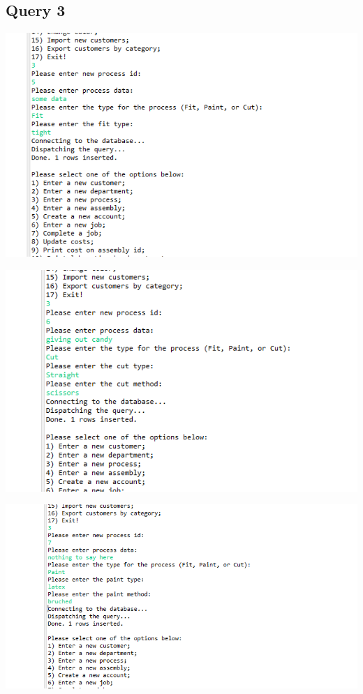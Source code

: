 \documentclass[11pt]{article}
\begin{document}
\subsection{Query 3}
\includegraphics[width = \textwidth]{process1.png}

\includegraphics[width = \textwidth]{process2.png}

\includegraphics[width = \textwidth]{process3.png}
\end{document}
